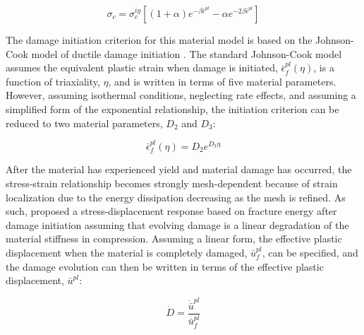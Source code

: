 \begin{equation}
\sigma_c=\sigma_c^{iy}\left [ \left ( 1+\alpha \right ) e^{-\beta\bar{\epsilon}^{pl}}-\alpha e^{-2\beta\bar{\epsilon}^{pl}}  \right ]
\label{eqn:param2-1}
\end{equation}

The damage initiation criterion for this material model is based on the Johnson-Cook model of ductile damage initiation \citep{Johnson_1985}. The standard Johnson-Cook model assumes the equivalent plastic strain when damage is initiated, $\bar{\epsilon}_{f}^{pl}\left(\eta\right)$, is a function of triaxiality, $\eta$, and is written in terms of five material parameters. However, assuming isothermal conditions, neglecting rate effects, and assuming a simplified form of the exponential relationship, the initiation criterion can be reduced to two material parameters, $D_2$ and $D_3$:

\begin{equation}
\bar{\epsilon}_{f}^{pl}\left(\eta\right)=D_{2}e^{D_{3}\eta}\label{eqn:druc8}
\end{equation}

After the material has experienced yield and material damage has occurred, the stress-strain relationship becomes strongly mesh-dependent because of strain localization due to the energy dissipation decreasing as the mesh is refined. As such, \citet{Hillerborg_1976} proposed a stress-displacement response based on fracture energy after damage initiation assuming that evolving damage is a linear degradation of the material stiffness in compression. Assuming a linear form, the effective plastic displacement when the material is completely damaged, $\bar{u}^{pl}_f$, can be specified, and the damage evolution can then be written in terms of the effective plastic displacement, $\bar{u}^{pl}$:

\begin{equation}
\dot{D}=\frac{\dot{\bar{u}}^{pl}}{\bar{u}_{f}^{pl}}\label{eqn:druc9-1}
\end{equation}

